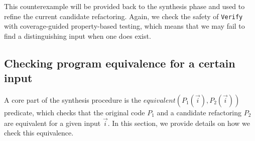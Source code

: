 \documentclass[sigconf,review,anonymous]{acmart}
\begin{document}
This counterexample will be provided back to the synthesis phase and
used to refine the current candidate refactoring. Again, we check the
safety of \texttt{Verify} with coverage-guided property-based testing,
which means that we may fail to find a distinguishing input when one
does exist.










\subsection{Checking program equivalence for a certain input}\label{sec:equiv}

A core part of the synthesis procedure is the $equivalent(P_1(\vec{i}), P_2(\vec{i}))$ predicate,
which checks that the original code $P_1$ and a candidate refactoring $P_2$
are equivalent for a given input $\vec{i}$.
In this section, we provide details on how we check this equivalence.
\end{document}

